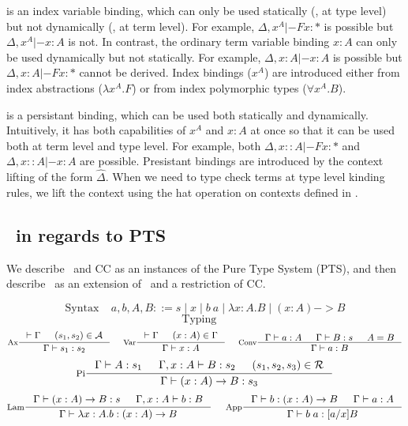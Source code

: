  is an index variable binding, which can only be used statically
(\ie, at type level) but not dynamically (\ie, at term level). For example,
$\Delta,x^A |- F {x} :*$ is possible but $\Delta,x^A |- x:A$ is not.
In contrast, the ordinary term variable binding $x:A$ can only be used
dynamically but not statically. For example, $\Delta,x:A |- x:A$ is possible
but $\Delta,x:A |- F {x}:*$ cannot be derived. Index bindings ($x^A$) are
introduced either from index abstractions ($\lambda x^A.F$)
or from index polymorphic types ($\forall x^A.B$).

 is a persistant binding, which can be used both statically and
dynamically. Intuitively, it has both capabilities of $x^A$ and $x:A$ at once
so that it can be used both at term level and type level. For example,
both $\Delta,x::A |- F {x} :*$ and $\Delta,x::A |- x:A$ are possible.
Presistant bindings are introduced by the context lifting of the form
$\hat\Delta$. When we need to type check terms at type level kinding rules,
we lift the context using the hat operation on contexts defined in .

\subsection{\Fi\ in regards to PTS}
We describe \Fw\ and CC as an instances of the Pure Type System (PTS),
and then describe \Fi\ as an extension of \Fw\ and a restriction of CC.

\[\text{Syntax}~~~~~ a,b,A,B ::= s \mid x \mid b~a \mid \lambda x:A.B
                                   \mid (x:A) -> B \]
\[\text{Typing}~~~~~\]
\[
 \inference[Ax]{|-\Gamma & (s_1,s_2)\in\calA}{\Gamma |- s_1 : s_2}
 ~~~~
 \inference[Var]{|-\Gamma & (x:A)\in\Gamma}{\Gamma |- x:A} 
 ~~~~
 \inference[Conv]{\Gamma |- a:A & \Gamma |- B:s & A=B}{\Gamma |- a:B}
\]
\[
 \inference[Pi]{\Gamma |- A:s_1 & \Gamma,x:A |- B:s_2 & (s_1,s_2,s_3)\in\calR}
               {\Gamma |- (x:A)-> B : s_3}
\]
\[
 \inference[Lam]{\Gamma |- (x:A)-> B : s & \Gamma,x:A |- b:B}
                {\Gamma |- \lambda x:A.b : (x:A)-> B}
 ~~~~
 \inference[App]{\Gamma |- b:(x:A)-> B & \Gamma |- a:A}{\Gamma |- b\;a:[a/x]B}
\]

